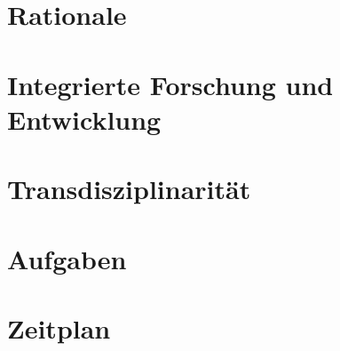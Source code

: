 \section{Rationale}





\section{Integrierte Forschung und Entwicklung}


\section{Transdisziplinarität}

\section{Aufgaben}


\section{Zeitplan}

